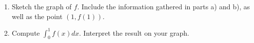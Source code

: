 \begin{exercise}{\Coffeecup \Coffeecup \Coffeecup}
\begin{enumerate}[label=\alph*.)]
\item Sketch the graph of $f$.  Include the information gathered in parts a) and b), as well as the point $(1,f(1))$.
\item Compute $\int_{0}^{1}{f(x)dx}$.  Interpret the result on your graph.
\end{enumerate}
\end{exercise}
